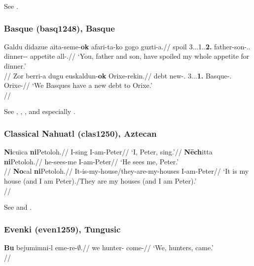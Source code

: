 \documentclass[A4paper]{article}
\begin{document}
See \citet[157, 159]{hewitt1989}.

\subsubsection{Basque (basq1248), Basque}

\pex
\a
\begingl
\gla Galdu didazue aita-seme-\textbf{ok} afari-ta-ko gogo guzti-a.//
\glb spoil 3\Sg{}.\Abs{}.\Aux{}.1\Sg{}.\Dat{}.\textbf{2\Pl{}.\Erg} father-son-\Proxart.\Pl{}.\Erg{} dinner-\Loc{}-\Lnk{} appetite all-\Det{}.\Abs{}//
\glft `{You, father and son}, have spoiled my whole appetite for dinner.' \\{\citep[502, (90a)]{derijk2008}}//
\endgl 
\a
\begingl
\gla Zor berri-a dugu euskaldun-\textbf{ok} Orixe-rekin.//
\glb debt new-\Det{}.\Abs{}{} 3\Sg{}.\Abs{}.\Aux{}.\textbf{1\Pl{}.\Erg} Basque-\Proxart.\Pl{}{} Orixe-\Com{}//
\glft `{We Basques} have a new debt to Orixe.' \\{\citep[502, (91a)]{derijk2008}}//
\endgl
\xe

See \citet[210]{saltarelli1988}, \citet[122]{trask2003}, \citet[482, 501f.]{derijk2008}, \citet[67]{areta2009} and especially \citet{artiagoitia2012DP}.

\subsubsection{Classical Nahuatl (clas1250), Aztecan}

\pex
\a
\begingl
\gla \textbf{Ni}cu\={\i}ca \textbf{ni}Petoloh.//
\glb I-sing I-am-Peter//
\glft `I, Peter, sing.'//
\endgl
\a
\begingl
\gla \textbf{N\={e}ch}itta \textbf{ni}Petoloh.//
\glb he-sees-me I-am-Peter//
\glft `He sees me, Peter.'\\{\citep[193]{andrews1975}}//
\endgl
\a
\begingl
\gla \textbf{No}cal \textbf{ni}Petoloh.//
\glb It-is-my-house/they-are-my-houses I-am-Peter//
\glft `It is my house (and I am Peter)./They are my houses (and I am Peter).'\\{\citep[194]{andrews1975}}//
\endgl
\xe

See \citet[192--194]{andrews1975} and \citealp[ch. 17.3]{andrews2003}.

\subsubsection{Evenki (even1259), Tungusic}

\ex \begingl
\gla  \textbf{Bu} bejumimni-l eme-re-$\emptyset$.//
\glb we hunter-\Pl{} come-\Pl//
\glft `We, hunters, came.' \\\citep[199, (794)]{nedjalkov1997}//
\endgl
\xe
\end{document}
